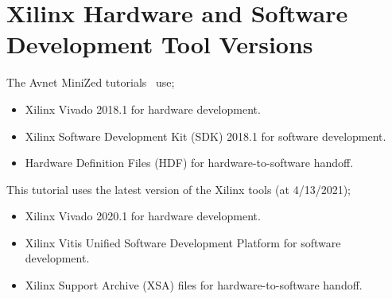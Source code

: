\section{Xilinx Hardware and Software Development Tool Versions}

The Avnet MiniZed tutorials~\cite{Avnet_MiniZed_Tutorial01_2018,
Avnet_MiniZed_Tutorial02_2018,Avnet_MiniZed_Tutorial03_2018,
Avnet_MiniZed_Tutorial04_2018,Avnet_MiniZed_Tutorial05_2018,
Avnet_MiniZed_Tutorial06_2018,Avnet_MiniZed_Tutorial07_2018,
Avnet_MiniZed_Tutorial08_2018} use;
%
\begin{itemize}
\item Xilinx Vivado 2018.1 for hardware development.
\item Xilinx Software Development Kit (SDK) 2018.1 for software development.
\item Hardware Definition Files (HDF) for hardware-to-software handoff.
\end{itemize}
%
This tutorial uses the latest version of the Xilinx tools (at 4/13/2021);
%
\begin{itemize}
\item Xilinx Vivado 2020.1 for hardware development.
\item Xilinx Vitis Unified Software Development Platform for software development.
\item Xilinx Support Archive (XSA) files for hardware-to-software handoff.
\end{itemize}
%

